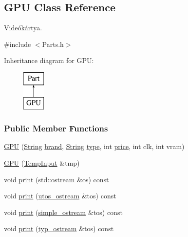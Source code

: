 \subsection{G\+PU Class Reference}
\label{class_g_p_u}


Videókártya.  




{\ttfamily \#include $<$Parts.\+h$>$}

Inheritance diagram for G\+PU\+:\begin{figure}[H]
\begin{center}
\leavevmode
\includegraphics[height=2.000000cm]{class_g_p_u}
\end{center}
\end{figure}
\subsubsection*{Public Member Functions}
\begin{DoxyCompactItemize}
\item 
\mbox{\hyperlink{class_g_p_u_a358f512b1583399e68f76248bb305e61}{G\+PU}} (\mbox{\hyperlink{class_string}{String}} \mbox{\hyperlink{class_part_ae06f2fdeb7fbbdb229a7aca151f3e341}{brand}}, \mbox{\hyperlink{class_string}{String}} \mbox{\hyperlink{class_part_a101dbcc5c4b21564df7414c7eb0eae88}{type}}, int \mbox{\hyperlink{class_part_a8e71223aed1da95a974f33d8d6c91bb1}{price}}, int clk, int vram)
\item 
\mbox{\hyperlink{class_g_p_u_a9b1632e965c26051ae583c9b5e1c2e3c}{G\+PU}} (\mbox{\hyperlink{struct_temp_input}{Temp\+Input}} \&tmp)
\item 
void \mbox{\hyperlink{class_g_p_u_abfa2a8fa30047e9759080d724e4b3820}{print}} (std\+::ostream \&os) const
\item 
void \mbox{\hyperlink{class_g_p_u_acfa9ab35cdf1c25c324fc39c6ffc2412}{print}} (\mbox{\hyperlink{structutos__ostream}{utos\+\_\+ostream}} \&tos) const
\item 
void \mbox{\hyperlink{class_g_p_u_a27cb964d5ce05efa75cb65d836b922e1}{print}} (\mbox{\hyperlink{structsimple__ostream}{simple\+\_\+ostream}} \&tos) const
\item 
void \mbox{\hyperlink{class_g_p_u_ad54f6d21007e216f27dc738aea2de836}{print}} (\mbox{\hyperlink{structtyp__ostream}{typ\+\_\+ostream}} \&tos) const
\end{DoxyCompactItemize}
